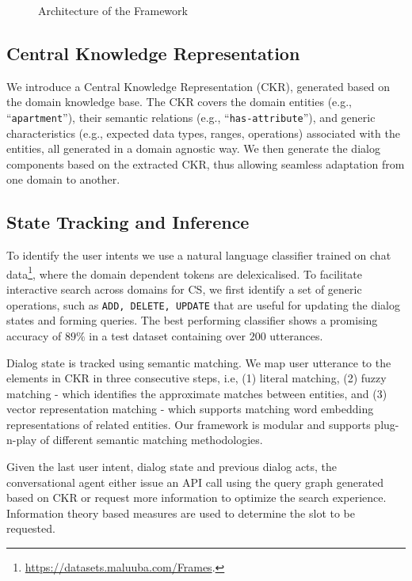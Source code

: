 \documentclass[letterpaper]{article} %
\begin{document}
\begin{figure}[!ht]
\centering
{}
\caption{Architecture of the Framework}
\label{fig:system}
\end{figure}


\subsection{Central Knowledge Representation}
We introduce a Central Knowledge Representation (CKR), generated based on the domain knowledge base.
The CKR covers the domain entities (e.g., ``\texttt{apartment}''), their semantic relations (e.g., ``\texttt{has-attribute}''),
and generic characteristics (e.g., expected data types, ranges, operations) associated with the entities, all generated in a domain agnostic way. We then generate the dialog components based on the extracted CKR, thus allowing seamless adaptation from one domain to another.

\vspace{-2.43mm}
\subsection{State Tracking and Inference}
To identify the user intents we use a natural language classifier \cite{yang2016hierarchical} trained on chat data\footnote{ \url{https://datasets.maluuba.com/Frames}.}, where the domain dependent tokens are delexicalised. To facilitate interactive search across domains for CS, we first identify a set of generic operations, such as {\texttt{ADD, DELETE, UPDATE}} that are useful for updating the dialog states and forming queries.
The best performing classifier shows a promising accuracy of $89\%$ in a test dataset containing over $200$ utterances. %

Dialog state is tracked using semantic matching. We map user utterance to the elements in CKR in three consecutive steps, i.e, (1) literal matching, (2) fuzzy matching - which identifies the approximate matches between entities, and (3) vector representation matching - which supports matching word embedding representations of related entities.
Our framework is modular and supports plug-n-play of different semantic matching methodologies.

Given the last user intent, dialog state and previous dialog acts, the conversational agent either issue an API call using the query graph generated based on CKR or request more information to optimize the search experience. Information theory based measures are used to determine the slot to be requested.
\end{document}
